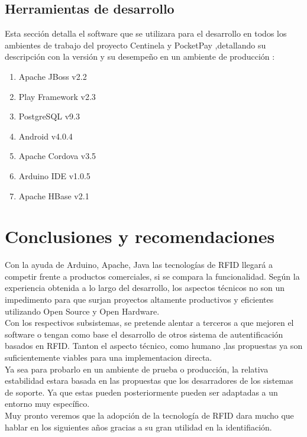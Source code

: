 \documentclass[11pt,twocolumn]{article}
\begin{document}
	\subsection{Herramientas de desarrollo}
	
	Esta secci\'on detalla el software que se utilizara para el desarrollo en 
	todos los ambientes de trabajo del proyecto Centinela y PocketPay ,detallando su 
	descripci\'on con la versi\'on y su desempe\~no en un ambiente de producci\'on :
	
	\begin{enumerate}
		\item Apache JBoss v2.2
		\item Play Framework v2.3
		\item PostgreSQL v9.3
		\item Android v4.0.4
		\item Apache Cordova v3.5
		\item Arduino IDE v1.0.5
		\item Apache HBase v2.1
	\end{enumerate}

\section{Conclusiones y recomendaciones}

Con la ayuda de Arduino, Apache, Java  las tecnolog\'ias de RFID llegar\'a a competir  frente a 
productos comerciales, si se compara la funcionalidad. Seg\'un la experiencia 
obtenida a lo largo del desarrollo, los  aspectos t\'ecnicos no son un impedimento 
para que surjan proyectos altamente productivos  y eficientes  utilizando Open Source y Open Hardware.
\\	
Con los respectivos subsistemas, se pretende alentar a terceros a 
que mejoren el software o tengan como base el desarrollo de otros sistema de 
autentificaci\'on basados en RFID. Tanton el aspecto t\'ecnico, como humano ,las 
propuestas ya son suficientemente viables para una implementacion directa.\\


Ya sea para probarlo en un ambiente de prueba o producci\'on, la relativa estabilidad estara basada 
en las propuestas que los desarradores de los sistemas de soporte. Ya que estas pueden posteriormente 
pueden ser adaptadas a un entorno muy espec\'ifico.
\\
Muy pronto veremos que la adopci\'on de la tecnolog\'ia de RFID dara mucho que 
hablar en los siguientes a\~nos gracias a su gran utilidad en la identifiaci\'on.
\\
\end{document}
